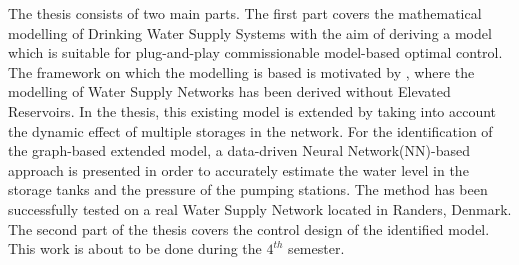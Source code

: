 The thesis consists of two main parts. The first part covers the mathematical modelling of Drinking Water Supply Systems with the aim of deriving a model which is suitable for plug-and-play commissionable model-based optimal control. The framework on which the modelling is based is motivated by \cite{oneinput_paper}, where the modelling of Water Supply Networks has been derived without Elevated Reservoirs. In the thesis, this existing model is extended by taking into account the dynamic effect of multiple storages in the network. For the identification of the graph-based extended model, a data-driven Neural Network(NN)-based approach is presented in order to accurately estimate the water level in the storage tanks and the pressure of the pumping stations. The method has been successfully tested on a real Water Supply Network located in Randers, Denmark. 
\newline
The second part of the thesis covers the control design of the identified model. This work is about to be done during the $4^{th}$ semester. 
